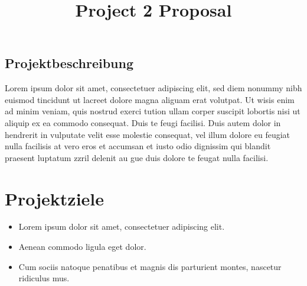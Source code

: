 \documentclass[
	trilingual,
	type=projectproposal,
	twocolumn
]{bfhpub}
\begin{document}
\title{Project 2 Proposal}
\subject{Das ist ein Teaser auf dem Titelblatt. Inveniat odis vid quist eos ut
	odicidi psandaest, omnis ex et re laborep eribusamet es ulluptaquia
	suntur se nihic in eum dero eossit, nihil imaximi llatus repta.}



%


\begin{ProjectDescription}
	\section{Projektbeschreibung}
	Lorem ipsum dolor sit amet, consectetuer adipiscing elit, sed diem nonummy nibh euismod tincidunt ut lacreet dolore magna aliguam erat volutpat. Ut wisis enim ad minim veniam, quis nostrud exerci tution ullam corper suscipit lobortis nisi ut aliquip ex ea commodo consequat. Duis te feugi facilisi. Duis autem dolor in hendrerit in vulputate velit esse molestie consequat, vel illum dolore eu feugiat nulla facilisis at vero eros et accumsan et iusto odio dignissim qui blandit praesent luptatum zzril delenit au gue duis dolore te feugat nulla facilisi.
\end{ProjectDescription}

\maketitle

\section{Projektziele}
\begin{itemize}
	\item Lorem ipsum dolor sit amet, consectetuer adipiscing elit.
	\item Aenean commodo ligula eget dolor. \cite{lamport94}
	\item Cum sociis natoque penatibus et magnis dis parturient montes, nascetur ridiculus mus.
\end{itemize}
\end{document}
